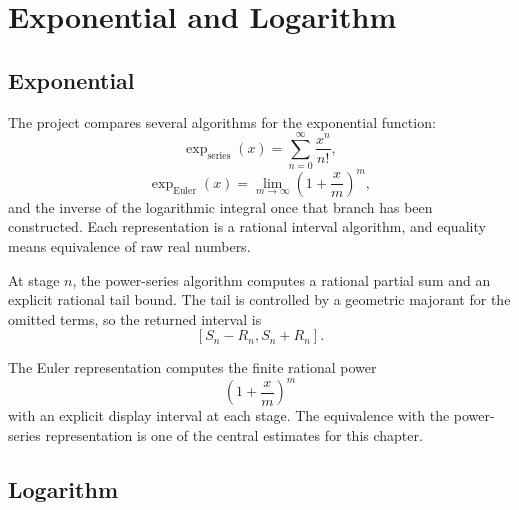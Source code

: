 \chapter{Exponential and Logarithm}

\section{Exponential}

\begin{definition}\label{def:exp-reps}
The project compares several algorithms for the exponential function:
\[
  \exp_{\mathrm{series}}(x)
  =
  \sum_{n=0}^{\infty}\frac{x^n}{n!},
\]
\[
  \exp_{\mathrm{Euler}}(x)
  =
  \lim_{m\to\infty}\left(1+\frac{x}{m}\right)^m,
\]
and the inverse of the logarithmic integral once that branch has been
constructed.  Each representation is a rational interval algorithm, and
equality means equivalence of raw real numbers.
\end{definition}

\begin{definition}
\label{def:exp-power-series-raw}
At stage \(n\), the power-series algorithm computes a rational partial sum and
an explicit rational tail bound.  The tail is controlled by a geometric
majorant for the omitted terms, so the returned interval is
\[
  [S_n-R_n,S_n+R_n].
\]
\end{definition}

\begin{definition}
\label{def:exp-euler-raw}
The Euler representation computes the finite rational power
\[
  \left(1+\frac{x}{m}\right)^m
\]
with an explicit display interval at each stage.  The equivalence with the
power-series representation is one of the central estimates for this chapter.
\end{definition}

\section{Logarithm}

